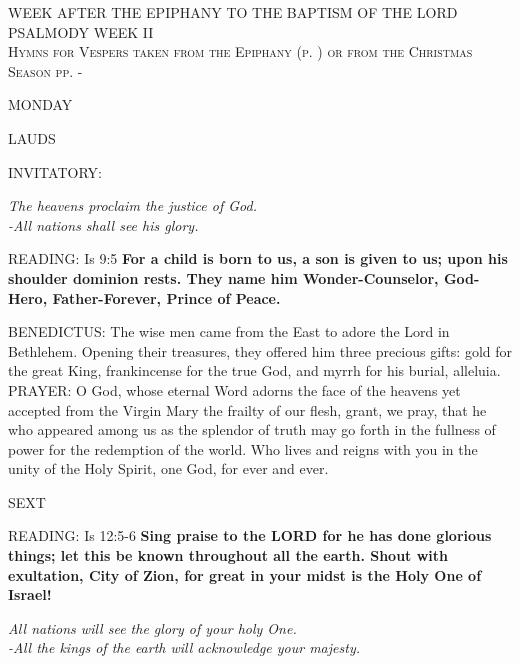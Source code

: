 \begin{center}\normalsize WEEK AFTER THE EPIPHANY TO THE BAPTISM OF THE LORD\\
\footnotesize{\uppercase{PSALMODY Week II}}\\
\tiny\textsc{Hymns for Vespers taken from the Epiphany (p. \pageref{christmas:epiphany:firstVespers}) or from the Christmas Season pp. \pageref{christmas:firstHymn}-\pageref{christmas:lastHymn}}
\end{center}

\begin{center}
\normalsize MONDAY
\end{center}

\begin{flushleft}\normalsize{\uppercase{LAUDS\\}}\end{flushleft}
\small{\uppercase{INVITATORY:}}\normalsize
\begin{center}
\textit{The heavens proclaim the justice of God.\\}
\textit{-All nations shall see his glory.\\}
\end{center}
\noindent\small{\uppercase{READING:}}    Is 9:5 \textbf{    For a child is born to us, a son is given to us; upon his shoulder dominion rests. They name him Wonder-Counselor, God-Hero, Father-Forever, Prince of Peace.\\}

\noindent\small{\uppercase{BENEDICTUS:}}	The wise men came from the East to adore the Lord in Bethlehem. Opening their treasures, they offered him three precious gifts: gold for the great King, frankincense for the true God, and myrrh for his burial, alleluia.\\

\noindent\small{\uppercase{PRAYER:}}	O God, whose eternal Word adorns the face of the heavens yet accepted from the Virgin Mary the frailty of our flesh, grant, we pray, that he who appeared among us as the splendor of truth may go forth in the fullness of power for the redemption of the world. Who lives and reigns with you in the unity of the Holy Spirit, one God, for ever and ever.

\begin{flushleft}\normalsize{\uppercase{SEXT\\}}\end{flushleft}
\noindent\small{\uppercase{READING:}}    Is 12:5-6 \textbf{   Sing praise to the LORD for he has done glorious things; let this be known throughout all the earth. Shout with exultation, City of Zion, for great in your midst is the Holy One of Israel!}
\begin{center}\textit{All nations will see the glory of your holy One.\\
-All the kings of the earth will acknowledge your majesty.}\end{center}

